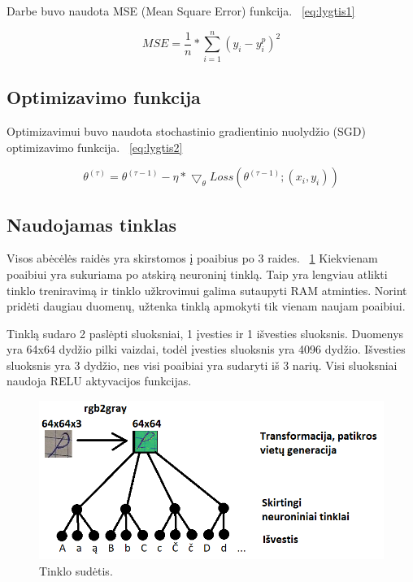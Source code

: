 \documentclass[conference]{IEEEtran}
\begin{document}
Darbe buvo naudota MSE (Mean Square Error) funkcija. ~\eqref{eq:lygtis1}

\begin{equation}
MSE = \frac{1}{n} * \sum_{i=1}^{n} (y_{i} - y_{i}^{p})^{2}
\label{eq:lygtis1}
\end{equation}

\subsection{Optimizavimo funkcija}

Optimizavimui buvo naudota stochastinio gradientinio nuolydžio
(SGD) optimizavimo funkcija. ~\eqref{eq:lygtis2}

\begin{equation}
\theta^{(\tau)} = \theta^{(\tau - 1)} - \eta * \bigtriangledown_{\theta} Loss(\theta^{(\tau - 1)};(x_{i}, y_{i}))
\label{eq:lygtis2}
\end{equation}

\subsection{Naudojamas tinklas}

Visos abėcėlės raidės yra skirstomos į poaibius po 3 raides. ~\ref{fig1} Kiekvienam poaibiui yra
sukuriama po atskirą neuroninį tinklą. Taip yra lengviau atlikti tinklo treniravimą
ir tinklo užkrovimui galima sutaupyti RAM atminties. Norint pridėti daugiau
duomenų, užtenka tinklą apmokyti tik vienam naujam poaibiui.
\par
Tinklą sudaro 2 paslėpti sluoksniai, 1 įvesties ir 1 išvesties sluoksnis. Duomenys
yra 64x64 dydžio pilki vaizdai, todėl įvesties sluoksnis yra 4096 dydžio. Išvesties
sluoksnis yra 3 dydžio, nes visi poaibiai yra sudaryti iš 3 narių. Visi sluoksniai naudoja
RELU aktyvacijos funkcijas.

\begin{figure}[!h] %
\centerline{\includegraphics[scale=0.4] {images/1.png}}
\caption{Tinklo sudėtis.}
\label{fig1}
\end{figure}
\end{document}
